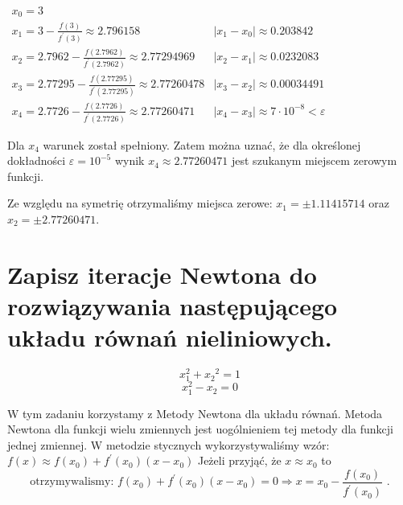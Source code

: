 \documentclass[5]{article}
\begin{document}
$
\begin{array}{ll}
x_{0}=3 \\ 
x_{1}=3-\frac{f(3)}{f^{\prime}(3)} \approx 2.796158 &
\left|x_{1}-x_{0}\right| \approx 0.203842 \\
x_{2}=2.7962-\frac{f(2.7962)}{f^{\prime}(2.7962)} \approx 2.77294969 &
\left|x_{2}-x_{1}\right| \approx 0.0232083 \\
x_{3}=2.77295-\frac{f(2.77295)}{f^{\prime}(2.77295)} \approx 2.77260478 &
\left|x_{3}-x_{2}\right| \approx 0.00034491 \\
x_{4}=2.7726-\frac{f(2.7726)}{f^{\prime}(2.7726)} \approx 2.77260471 &
\left|x_{4}-x_{3}\right| \approx 7 \cdot 10^{-8}<\varepsilon
\end{array}
$

\vspace{3mm}
Dla $x_{4}$ warunek został spełniony. Zatem można uznać, że dla określonej dokładności $\varepsilon=10^{-5}$ wynik $x_{4} \approx 2.77260471$ jest szukanym miejscem zerowym funkcji.

\vspace{6mm}
Ze względu na symetrię otrzymaliśmy miejsca zerowe: $x_{1}=\pm 1.11415714$ oraz $x_{2}=\pm 2.77260471$.


\section{Zapisz iteracje Newtona do rozwiązywania następującego układu równań nieliniowych.}
$$
x_1^2 + {x_2}^2 = 1 
$$ $$
x_1^2 - x_2 = 0
$$

W tym zadaniu korzystamy z Metody Newtona dla układu równań.
Metoda Newtona dla funkcji wielu zmiennych jest uogólnieniem tej metody dla funkcji jednej zmiennej. W metodzie stycznych wykorzystywaliśmy wzór: $f(x) \approx f\left(x_{0}\right)+f^{\prime}\left(x_{0}\right)\left(x-x_{0}\right)$ Jeżeli przyjąć, że $x \approx x_{0}$ to
$$
\text { otrzymywalismy: } f\left(x_{0}\right)+f^{\prime}\left(x_{0}\right)\left(x-x_{0}\right)=0 \Rightarrow x=x_{0}-\frac{f\left(x_{0}\right)}{f^{\prime}\left(x_{0}\right)} \text { . }
$$
\end{document}
